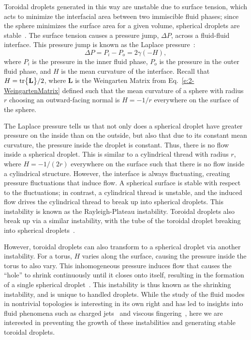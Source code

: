 Toroidal droplets generated in this way are unstable due to surface tension, which acts to minimize the interfacial area between two immiscible fluid phases; since the sphere minimizes the surface area for a given volume, spherical droplets are stable~\cite{RN178}.
The surface tension causes a pressure jump, $\Delta P$, across a fluid-fluid interface.
This pressure jump is known as the Laplace pressure~\cite{RN178}:
\begin{equation}\label{e:3-LapPres}
  \Delta P = P_i - P_o = 2 \gamma (- H),
\end{equation}
where $P_i$ is the pressure in the inner fluid phase, $P_o$ is the pressure in the outer fluid phase, and $H$ is the mean curvature of the interface.
Recall that $H = \textup{tr}\big \{ \mathbf{L} \big \}/2$, where $\mathbf{L}$ is the Weingarten Matrix from Eq.~\ref{e:2-WeingartenMatrix} defined such that the mean curvature of a sphere with radius $r$ choosing an outward-facing normal is $H = -1/r$ everywhere on the surface of the sphere.

The Laplace pressure tells us that not only does a spherical droplet have greater pressure on the inside than on the outside, but also that due to its constant mean curvature, the pressure inside the droplet is constant.
Thus, there is no flow inside a spherical droplet.
This is similar to a cylindrical thread with radius $r$, where $H = -1/(2r)$ everywhere on the surface such that there is no flow inside a cylindrical structure.
However, the interface is always fluctuating, creating pressure fluctuations that induce flow.
A spherical surface is stable with respect to the fluctuations; in contrast, a cylindrical thread is unstable, and the induced flow drives the cylindrical thread to break up into spherical droplets.
This instability is known as the Rayleigh-Plateau instability.
Toroidal droplets also break up via a similar instability, with the tube of the toroidal droplet breaking into spherical droplets~\cite{RN29,RN256}.

However, toroidal droplets can also transform to a spherical droplet via another instability.
For a torus, $H$ varies along the surface, causing the pressure inside the torus to also vary.
This inhomogeneous pressure induces flow that causes the ``hole'' to shrink continuously until it closes onto itself, resulting in the formation of a single spherical droplet~\cite{RN29,RN255}.
This instability is thus known as the shrinking instability, and is unique to handled droplets.
While the study of the fluid modes in nontrivial topologies is interesting in its own right and has led to insights into fluid phenomena such as charged jets~\cite{RN256} and viscous fingering~\cite{RN254}, here we are interested in preventing the growth of these instabilities and generating stable toroidal droplets.

